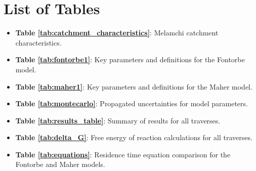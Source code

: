 \documentclass[hidelinks, 12pt]{article} %
\begin{document}
\section*{List of Tables}

{\normalsize

\begin{itemize}[wide]
  \setlength{\itemindent}{-0mm}  %

  \item[] \textbf{Table \ref{tab:catchment_characteristics}}: Melamchi catchment characteristics.
  \item[] \textbf{Table \ref{tab:fontorbe1}}: Key parameters and definitions for the Fontorbe model.
  \item[] \textbf{Table \ref{tab:maher1}}: Key parameters and definitions for the Maher model.
  \item[] \textbf{Table \ref{tab:montecarlo}}: Propagated uncertainties for model parameters.
  \item[] \textbf{Table \ref{tab:results_table}}: Summary of results for all traverses.
  \item[] \textbf{Table \ref{tab:delta_G}}: Free energy of reaction calculations for all traverses.
  \item[] \textbf{Table \ref{tab:equations}}: Residence time equation comparison for the Fontorbe and Maher models.

\end{itemize}

}


\newpage


\FloatBarrier







\newpage




\newpage





\newpage





\newpage





\newpage




\printbibliography

\newpage


\end{document}
